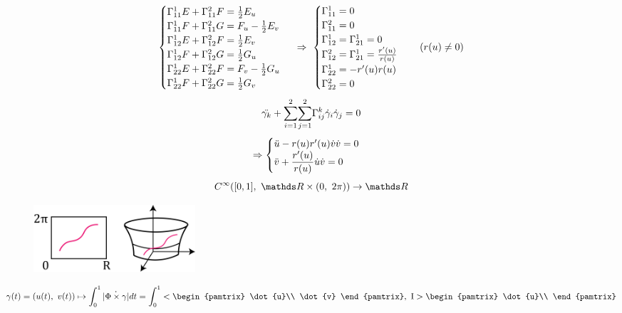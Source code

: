 \documentclass[main]{sub\Phiiles}
\begin{document}
\begin{Sol}
\[\begin{cases}
            \Gamma^1_{11} E + \Gamma_{11}^2 F = \frac{1}{2}E_u\\
            \Gamma^1_{11} F + \Gamma_{11}^2 G = F_u - \frac{1}{2}E_v\\
            \Gamma^1_{12} E + \Gamma_{12}^2 F = \frac{1}{2} E_v\\
            \Gamma_{12}^1 F + \Gamma_{12}^2 G = \frac{1}{2} G_u\\
            \Gamma_{22}^1 E + \Gamma_{22}^2 F = F_v - \frac{1}{2}G_u\\
            \Gamma_{22}^1 F + \Gamma_{22}^2 G = \frac{1}{2} G_v
        \end{cases} \ \Rightarrow\ 
        \begin{cases}
            \Gamma^1_{11} = 0\\
            \Gamma_{11}^2 = 0\\
            \Gamma^1_{12} = \Gamma^1_{21} = 0\\
            \Gamma_{12}^2 = \Gamma_{21}^1 = \frac{r'(u)}{r(u)}\\
            \Gamma_{22}^1 = - r'(u) r(u)\\
            \Gamma_{22}^2 = 0
        \end{cases} \quad (r(u) \neq 0)\]
        \[\ddot{\gamma_k} + \underset{i=1}{\overset{2}{\sum}} \underset{j=1}{\overset{2}{\sum}} \Gamma_{ij}^k \dot{\gamma}_i \dot{\gamma}_j = 0\]
        \[\Rightarrow \begin{cases}
            \ddot{u} - r(u) r'(u) \dot{v} \dot{v} = 0\\
            \ddot{v} + \dfrac{r'(u)}{r(u)} \dot{u} \dot{v} = 0
        \end{cases}\]
        \[C^{\infty}([0,1],\ \R \times (0,\ 2\pi)) \ra \R\]
        \begin{figure}[H]
            \centering
            \includegraphics[width=6cm]{pics/15_1}
        \end{figure}
        \[\gamma(t) = (u(t),\ v(t)) \mapsto \int_0^1 |\dot{\Phi \times \gamma}| dt = \int_0^1 <\begin{pamtrix}
          \dot{u}\\
          \dot{v}
        \end{pamtrix},\ \RNumb{1}>\begin{pamtrix}
          \dot{u}\\

\end{pamtrix}\]
\end{Sol}
\end{document}
